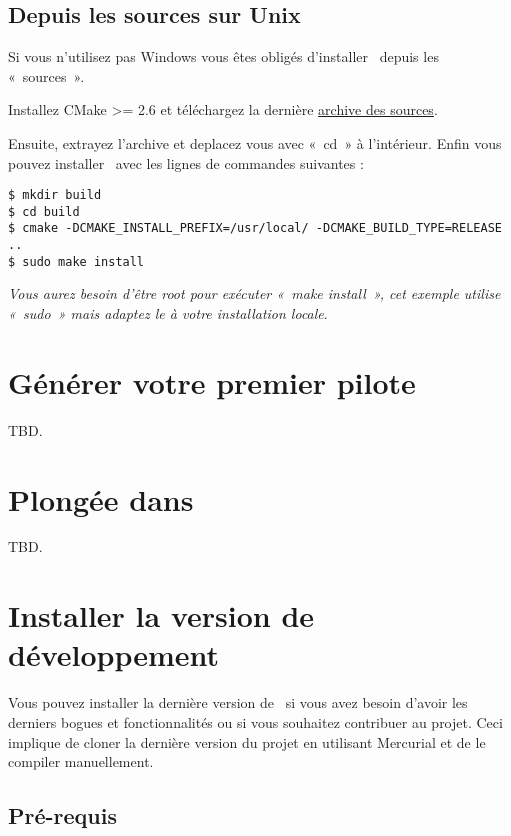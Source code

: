 \documentclass[francais]{rtxarticle}
\begin{document}
\subsection{Depuis les sources sur Unix}

Si vous n'utilisez pas Windows vous êtes obligés d'installer \rtx\ depuis les
«~sources~».

Installez CMake >= 2.6 et téléchargez la dernière
\href{http://rathaxes.googlecode.com/files/rathaxes-src-latest.tar.gz}{archive
des sources}.

Ensuite, extrayez l'archive et deplacez vous avec «~cd~» à l'intérieur. Enfin
vous pouvez installer \rtx\ avec les lignes de commandes suivantes :

\begin{lstlisting}
$ mkdir build
$ cd build
$ cmake -DCMAKE_INSTALL_PREFIX=/usr/local/ -DCMAKE_BUILD_TYPE=RELEASE ..
$ sudo make install
\end{lstlisting}

\emph{Vous aurez besoin d'être root pour exécuter «~make install~», cet exemple
utilise «~sudo~» mais adaptez le à votre installation locale}.

\section{Générer votre premier pilote}

TBD.

\section{Plongée dans \rtx}

TBD.


\section{Installer la version de développement}

Vous pouvez installer la dernière version de \rtx\ si vous avez besoin d'avoir
les derniers bogues et fonctionnalités ou si vous souhaitez contribuer au
projet. Ceci implique de cloner la dernière version du projet en utilisant
Mercurial et de le compiler manuellement.

\subsection{Pré-requis}
\end{document}
